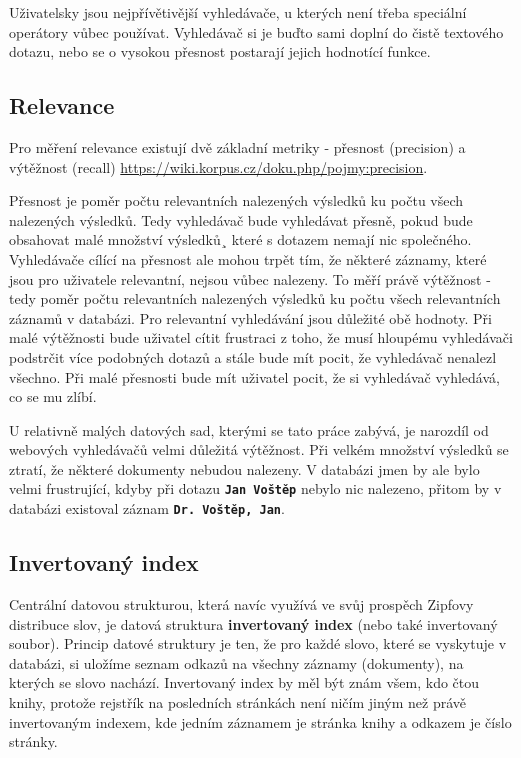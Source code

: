 \documentclass[11pt,letterpaper,oneside,openright]{book}
\newcommand{\bftt}[1]{\texttt{\textbf{#1}}}
\begin{document}
Uživatelsky jsou nejpřívětivější vyhledávače, u kterých není třeba speciální
operátory vůbec používat. Vyhledávač si je buďto sami doplní do čistě textového
dotazu, nebo se o vysokou přesnost postarají jejich hodnotící funkce.

\subsection{Relevance}
Pro měření relevance existují dvě základní metriky - přesnost (precision) a
výtěžnost (recall) \url{https://wiki.korpus.cz/doku.php/pojmy:precision}.

Přesnost je poměr počtu relevantních nalezených výsledků ku počtu všech
nalezených výsledků. Tedy vyhledávač bude vyhledávat přesně, pokud bude
obsahovat malé množství výsledků¸ které s dotazem nemají nic společného.
Vyhledávače cílící na přesnost ale mohou trpět tím, že některé záznamy, které
jsou pro uživatele relevantní, nejsou vůbec nalezeny. To měří právě výtěžnost -
tedy poměr počtu relevantních nalezených výsledků ku počtu všech relevantních
záznamů v databázi. Pro relevantní vyhledávání jsou důležité obě hodnoty. Při
malé výtěžnosti bude uživatel cítit frustraci z toho, že musí hloupému
vyhledávači podstrčit více podobných dotazů a stále bude mít pocit, že
vyhledávač nenalezl všechno. Při malé přesnosti bude mít uživatel pocit, že si
vyhledávač vyhledává, co se mu zlíbí.

U relativně malých datových sad, kterými se tato práce zabývá, je narozdíl od
webových vyhledávačů velmi důležitá výtěžnost. Při velkém množství výsledků se
ztratí, že některé dokumenty nebudou nalezeny. V databázi jmen by ale bylo
velmi frustrující, kdyby při dotazu \bftt{Jan Voštěp} nebylo nic nalezeno,
přitom by v databázi existoval záznam \bftt{Dr. Voštěp, Jan}.

\subsection{Invertovaný index}
Centrální datovou strukturou, která navíc využívá ve svůj prospěch Zipfovy
distribuce slov, je datová struktura \textbf{invertovaný index} (nebo také
invertovaný soubor). Princip datové struktury je ten, že pro každé slovo, které
se vyskytuje v databázi, si uložíme seznam odkazů na všechny záznamy
(dokumenty), na kterých se slovo nachází.  Invertovaný index by měl být znám
všem, kdo čtou knihy, protože rejstřík na posledních stránkách není ničím jiným
než právě invertovaným indexem, kde jedním záznamem je stránka knihy a odkazem
je číslo stránky.
\end{document}
